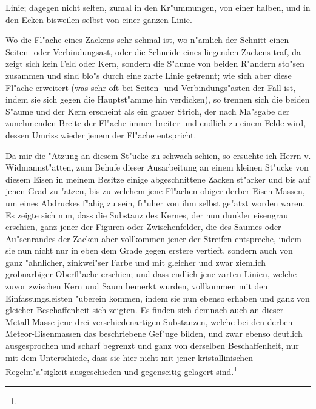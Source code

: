 \documentclass[a4paper, 11pt, oneside, german]{article}
\begin{document}
Linie; dagegen nicht selten, zumal in den Kr"ummungen, von einer halben, und in den Ecken bisweilen selbst von einer ganzen Linie.

Wo die Fl"ache eines Zackens sehr schmal ist, wo n"amlich der Schnitt einen Seiten- oder Verbindungsast, oder die Schneide eines liegenden Zackens traf, da zeigt sich kein Feld oder Kern, sondern die S"aume von beiden R"andern sto"sen zusammen und sind blo"s durch eine zarte Linie getrennt; wie sich aber diese Fl"ache erweitert (was sehr oft bei Seiten- und Verbindungs"asten der Fall ist, indem sie sich gegen die Hauptst"amme hin verdicken), so trennen sich die beiden S"aume und der Kern erscheint als ein grauer Strich, der nach Ma"sgabe der zunehmenden Breite der Fl"ache immer breiter und endlich zu einem Felde wird, dessen Umriss wieder jenem der Fl"ache entspricht.

Da mir die "Atzung an diesem St"ucke zu schwach schien, so ersuchte ich Herrn v. Widmannst"atten, zum Behufe dieser Ausarbeitung an einem kleinen St"ucke von diesem Eisen in meinem Besitze einige abgeschnittene Zacken st"arker und bis auf jenen Grad zu "atzen, bis zu welchem jene Fl"achen obiger derber Eisen-Massen, um eines Abdruckes f"ahig zu sein, fr"uher von ihm selbst ge"atzt worden waren. Es zeigte sich nun, dass die Substanz des Kernes, der nun dunkler eisengrau erschien, ganz jener der Figuren oder Zwischenfelder, die des Saumes oder Au"senrandes der Zacken aber vollkommen jener der Streifen entspreche, indem sie nun nicht nur in eben dem Grade gegen erstere vertieft, sondern auch von ganz "ahnlicher, zinkwei"ser Farbe und mit gleicher und zwar ziemlich grobnarbiger Oberfl"ache erschien; und dass endlich jene zarten Linien, welche zuvor zwischen Kern und Saum bemerkt wurden, vollkommen mit den Einfassungsleisten "uberein kommen, indem sie nun ebenso erhaben und ganz von gleicher Beschaffenheit sich zeigten. Es finden sich demnach auch an dieser Metall-Masse jene drei verschiedenartigen Substanzen, welche bei den derben Meteor-Eisenmassen das beschriebene Gef"uge bilden, und zwar ebenso deutlich ausgesprochen und scharf begrenzt und ganz von derselben Beschaffenheit, nur mit dem Unterschiede, dass sie hier nicht mit jener kristallinischen Regelm"a"sigkeit ausgeschieden und gegenseitig gelagert sind.\footnote{}
\end{document}
